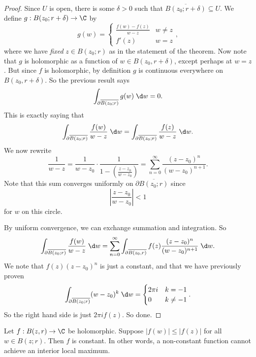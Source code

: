 \documentclass[a4paper]{article}
\begin{document}
\begin{proof}
  Since $U$ is open, there is some $\delta > 0$ such that $\overline{B(z_0; r + \delta)} \subseteq U$. We define $g: B(z_0; r+ \delta) \to \C$ by
  \[
    g(w) =
    \begin{cases}
      \frac{f(w) - f(z)}{w - z} & w \not= z\\
      f'(z) & w = z
    \end{cases},
  \]
  where we have \emph{fixed} $z \in B(z_0; r)$ as in the statement of the theorem. Now note that $g$ is holomorphic as a function of $w \in B(z_0, r + \delta)$, except perhaps at $w = z$. But since $f$ is holomorphic, by definition $g$ is continuous everywhere on $B(z_0, r + \delta)$. So the previous result says
  \[
    \int_{\partial \overline{B(z_0; r)}} g(w)\;\d w = 0.
  \]
  This is exactly saying that
  \[
    \int_{\partial \overline{B(z_0; r)}} \frac{f(w)}{w - z} \;\d w= \int_{\partial \overline{B(z_0; r)}} \frac{f(z)}{w - z}\;\d w.
  \]
  We now rewrite
  \[
    \frac{1}{w - z} = \frac{1}{w - z_0} \cdot \frac{1}{1 - \left(\frac{z - z_0}{w - z_0}\right)} = \sum_{n = 0}^\infty \frac{(z - z_0)^n}{(w - z_0)^{n + 1}}.
  \]
  Note that this sum converges uniformly on $\partial \overline{B(z_0; r)}$ since
  \[
    \left|\frac{z - z_0}{w - z_0}\right| < 1
  \]
  for $w$ on this circle.

  By uniform convergence, we can exchange summation and integration. So
  \[
    \int_{\partial \overline{B(z_0; r)}} \frac{f(w)}{w - z} \;\d w = \sum_{n = 0}^\infty \int_{\partial \overline{B(z_0, r)}} f(z) \frac{(z - z_0)^n}{(w - z_0)^{n + 1}}\;\d w.
  \]
  We note that $f(z) (z - z_0)^n$ is just a constant, and that we have previously proven
  \[
    \int_{\partial \overline{B(z_0; r)}} (w - z_0)^k \;\d w =
    \begin{cases}
      2\pi i & k = -1\\
      0 & k \not= -1
    \end{cases}.
  \]
  So the right hand side is just $2\pi i f(z)$. So done.
\end{proof}

\begin{cor}
  Let $f: B(z, r) \to \C$ be holomorphic. Suppose $|f(w)| \leq |f(z)|$ for all $w \in B(z; r)$. Then $f$ is constant. In other words, a non-constant function cannot achieve an interior local maximum.
\end{cor}
\end{document}
